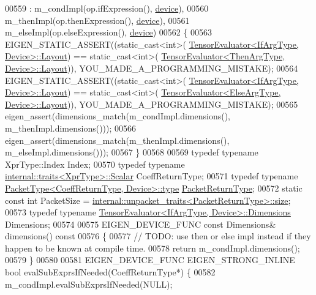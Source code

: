 \begin{DoxyCode}
00559     : m\_condImpl(op.ifExpression(), \hyperlink{struct_eigen_1_1_tensor_evaluator_a98b51809ed8f7a1f736eb7b952b9636e}{device}),
00560       m\_thenImpl(op.thenExpression(), \hyperlink{struct_eigen_1_1_tensor_evaluator_a98b51809ed8f7a1f736eb7b952b9636e}{device}),
00561       m\_elseImpl(op.elseExpression(), \hyperlink{struct_eigen_1_1_tensor_evaluator_a98b51809ed8f7a1f736eb7b952b9636e}{device})
00562   \{
00563     EIGEN\_STATIC\_ASSERT((static\_cast<int>(
      \hyperlink{struct_eigen_1_1_tensor_evaluator}{TensorEvaluator<IfArgType, Device>::Layout}) == static\_cast<int>(
      \hyperlink{struct_eigen_1_1_tensor_evaluator}{TensorEvaluator<ThenArgType, Device>::Layout})), 
      YOU\_MADE\_A\_PROGRAMMING\_MISTAKE);
00564     EIGEN\_STATIC\_ASSERT((static\_cast<int>(
      \hyperlink{struct_eigen_1_1_tensor_evaluator}{TensorEvaluator<IfArgType, Device>::Layout}) == static\_cast<int>(
      \hyperlink{struct_eigen_1_1_tensor_evaluator}{TensorEvaluator<ElseArgType, Device>::Layout})), 
      YOU\_MADE\_A\_PROGRAMMING\_MISTAKE);
00565     eigen\_assert(dimensions\_match(m\_condImpl.dimensions(), m\_thenImpl.dimensions()));
00566     eigen\_assert(dimensions\_match(m\_thenImpl.dimensions(), m\_elseImpl.dimensions()));
00567   \}
00568 
00569   \textcolor{keyword}{typedef} \textcolor{keyword}{typename} XprType::Index Index;
00570   \textcolor{keyword}{typedef} \textcolor{keyword}{typename} \hyperlink{struct_eigen_1_1internal_1_1traits}{internal::traits<XprType>::Scalar} CoeffReturnType;
00571   \textcolor{keyword}{typedef} \textcolor{keyword}{typename} \hyperlink{group___sparse_core___module}{PacketType<CoeffReturnType, Device>::type} 
      \hyperlink{group___sparse_core___module}{PacketReturnType};
00572   \textcolor{keyword}{static} \textcolor{keyword}{const} \textcolor{keywordtype}{int} PacketSize = 
      \hyperlink{struct_eigen_1_1internal_1_1unpacket__traits}{internal::unpacket\_traits<PacketReturnType>::size};
00573   \textcolor{keyword}{typedef} \textcolor{keyword}{typename} \hyperlink{struct_eigen_1_1_tensor_evaluator}{TensorEvaluator<IfArgType, Device>::Dimensions}
       Dimensions;
00574 
00575   EIGEN\_DEVICE\_FUNC \textcolor{keyword}{const} Dimensions& dimensions()\textcolor{keyword}{ const}
00576 \textcolor{keyword}{  }\{
00577     \textcolor{comment}{// TODO: use then or else impl instead if they happen to be known at compile time.}
00578     \textcolor{keywordflow}{return} m\_condImpl.dimensions();
00579   \}
00580 
00581   EIGEN\_DEVICE\_FUNC EIGEN\_STRONG\_INLINE \textcolor{keywordtype}{bool} evalSubExprsIfNeeded(CoeffReturnType*) \{
00582     m\_condImpl.evalSubExprsIfNeeded(NULL);

\end{DoxyCode}
